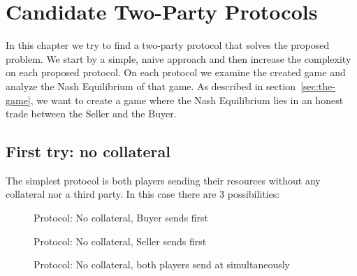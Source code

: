 \documentclass{cacthesis}
\begin{document}
\chapter{Candidate Two-Party Protocols}
\label{cha:candidates}
In this chapter we try to find a two-party protocol that solves the proposed problem. We start by a simple, naive approach and then increase the complexity on each proposed protocol. On each protocol we examine the created game and analyze the Nash Equilibrium of that game. As described in section~\ref{sec:the-game}, we want to create a game where the Nash Equilibrium lies in an honest trade between the Seller and the Buyer.

\section{First try: no collateral}
\label{sec:first-try-nocol}
The simplest protocol is both players sending their resources without any collateral nor a third party. In this case there are 3 possibilities:
\begin{figure}[htb!]
    \centering
    \caption{Protocol: No collateral, Buyer sends first}
    \label{pro:naive-Buyer-first}
\end{figure}

\begin{figure}[htb!]
    \centering
    \caption{Protocol: No collateral, Seller sends first}
    \label{pro:naive-Seller-first}
\end{figure}

\begin{figure}[htb!]
    \centering
    \caption{Protocol: No collateral, both players send at simultaneously}
    \label{pro:naive-simultaneous}
\end{figure}

\end{document}

